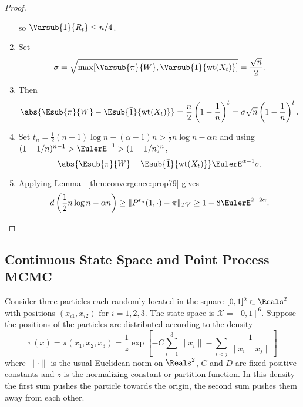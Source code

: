 \documentclass[12pt]{article}
\begin{document}
\begin{proof}
\begin{enumerate}
             \le {} \) so \(
            \Varsub{\bar{1}}{R_t} \le n/4 \).
        \item
            Set
            \[
                \sigma = \sqrt{\max[\Varsub{\pi}{W}, \Varsub{\bar{1}}{%
                \operatorname{wt}
                (X_t)}]} = \frac{\sqrt{n}}{2}.
            \]
        \item
            Then
            \[
                \abs{\Esub{\pi}{W} - \Esub{\bar{1}}{%
                \operatorname{wt}
                (X_t)} } = \frac{n}{2} \left( 1 - \frac{1}{n} \right)^t
                = \sigma \sqrt{n} \left( 1 - \frac{1}{n} \right)^t.
            \]
        \item
            Set \( t_n = \frac{1}{2}(n-1)\log n - (\alpha-1)n > \frac{1}
            {2}n \log n - \alpha n \) and using \( (1-1/n)^{n-1} >
            \EulerE^{-1} > (1 - 1/n)^n \),
            \[
                \abs{\Esub{\pi}{W} - \Esub{\bar{1}}{%
                \operatorname{wt}
                (X_t)} } \EulerE^{\alpha-1} \sigma.
            \]
        \item
            Applying Lemma~%
            \ref{thm:convergence:prop79} gives
            \[
                d\left(\frac{1}{2} n \log n - \alpha n \right) \ge \| P^
                {t_n}(\bar{1}, \cdot) - \pi \|_{TV} \ge 1 - 8\EulerE^{2-2\alpha}.
            \]
    \end{enumerate}
\end{proof}

\subsection*{Continuous State Space and Point Process MCMC}

Consider three particles each randomly located in the square \( [0,1]^2
\subset \Reals^2 \) with positions \( (x_{i1}, x_{i2}) \) for \( i =
1,2,3 \).  The state space is \( \mathcal{X} = [0,1]^6 \).  Suppose the
positions of the particles are distributed according to the density
\[
    \pi(x) = \pi(x_1,x_2,x_3) = \frac{1}{z} \exp\left[ -C \sum\limits_{i=1}^3
    \|x_i\| - \sum\limits_{i<j} \frac{1}{\| x_i - x_j \|} \right]
\] where \( \| \cdot \| \) is the usual Euclidean norm on \( \Reals^2 \),
\( C \) and \( D \) are fixed positive constants and \( z \) is the
normalizing constant or partition function.  In this density the first
sum pushes the particle towards the origin, the second sum pushes them
away from each other.
\end{document}
